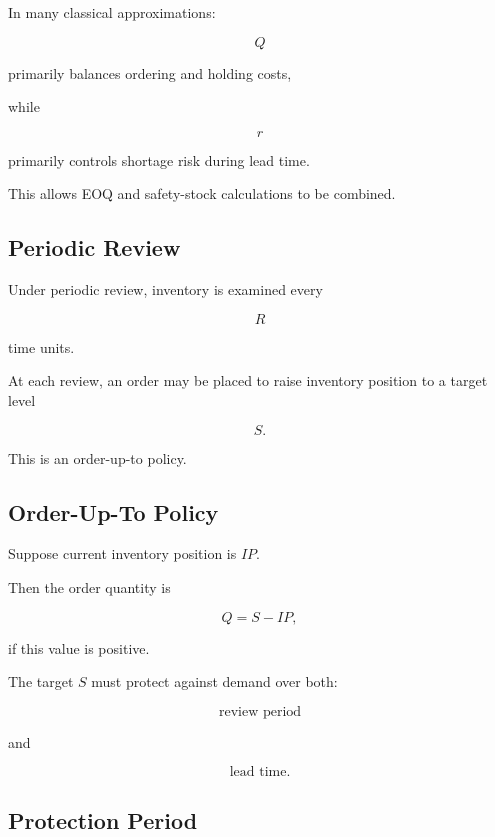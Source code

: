 In many classical approximations:

\[
\boxed{
Q
}
\]

primarily balances ordering and holding costs,

while

\[
\boxed{
r
}
\]

primarily controls shortage risk during lead time.

This allows EOQ and safety-stock calculations to be combined.

\subsection{Periodic Review}
\label{subsec:periodic-review}

Under periodic review, inventory is examined every

\[
R
\]

time units.

At each review, an order may be placed to raise inventory position to a
target level

\[
\boxed{
S.
}
\]

This is an order-up-to policy.

\subsection{Order-Up-To Policy}
\label{subsec:order-up-to-policy}

Suppose current inventory position is \(IP\).

Then the order quantity is

\[
\boxed{
Q
=
S-IP,
}
\]

if this value is positive.

The target \(S\) must protect against demand over both:

\[
\boxed{
\text{review period}
}
\]

and

\[
\boxed{
\text{lead time}.
}
\]

\subsection{Protection Period}
\label{subsec:inventory-protection-period}


